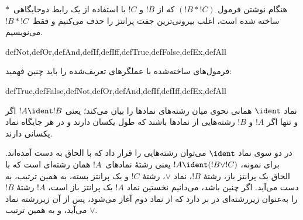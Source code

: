 \documentclass[../../../include/open-logic-section]{subfiles}
\begin{document}
هنگام نوشتن فرمول $(!B \ast !C)$ که از $!B$ و $!C$ با استفاده از یک رابط
دوجایگاهی~$\ast$ ساخته شده است، اغلب بیرونی‌ترین جفت پرانتز را حذف می‌کنیم
و فقط~$!B \ast !C$ می‌نویسیم.

\begin{tagblock}{defNot,defOr,defAnd,defIf,defIff,defTrue,defFalse,defEx,defAll}
\begin{defn}
فرمول‌های ساخته‌شده با عملگرهای تعریف‌شده را باید چنین فهمید:

\begin{tagenumerate}{defTrue,defFalse,defNot,defOr,defAnd,defIf,defIff,defEx,defAll}







\end{tagenumerate}
\end{defn}
\end{tagblock}

\begin{defn}
نماد $\ident$ همانی نحوی میان رشته‌های نمادها را بیان می‌کند؛ یعنی
$!A \ident !B$ اگر و تنها اگر $!A$ و $!B$ رشته‌هایی از نمادها باشند که
طول یکسان دارند و در هر جایگاه نماد یکسانی دارند.
\end{defn}

در دو سوی نماد $\ident$ می‌توان رشته‌هایی را قرار داد که با الحاق به دست
آمده‌اند. برای نمونه، $!A \ident (!B \lor !C)$ یعنی رشتهٔ نمادهای~$!A$
همان رشته‌ای است که با الحاق یک پرانتز باز، رشتهٔ $!B$، نماد $\lor$، رشتهٔ
$!C$ و یک پرانتز بسته، به همین ترتیب، به دست می‌آید. اگر چنین باشد، می‌دانیم
نخستین نماد $!A$ یک پرانتز باز است، $!A$ رشتهٔ $!B$ را به‌عنوان زیررشته‌ای
در بر دارد که از نماد دوم آغاز می‌شود، پس از آن زیررشته نماد $\lor$ می‌آید،
و به همین ترتیب.
\end{document}
